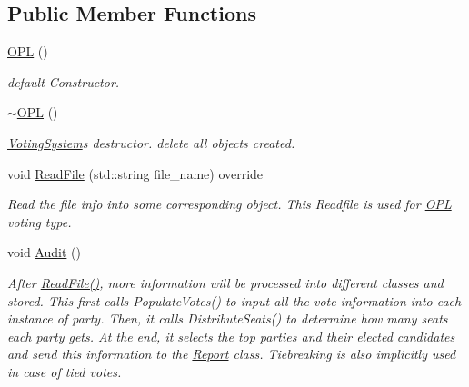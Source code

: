 \subsection*{Public Member Functions}
\begin{DoxyCompactItemize}
\item 
\mbox{\label{classOPL_aee8e3e8733a174df302be1ee7b287a68}} 
\hyperlink{classOPL_aee8e3e8733a174df302be1ee7b287a68}{O\+PL} ()
\begin{DoxyCompactList}\small\item\em default Constructor. \end{DoxyCompactList}\item 
\mbox{\label{classOPL_a22c35b5bf51f6b8f8451a48fcc1f88ba}} 
\hyperlink{classOPL_a22c35b5bf51f6b8f8451a48fcc1f88ba}{$\sim$\+O\+PL} ()
\begin{DoxyCompactList}\small\item\em \hyperlink{classVotingSystem}{Voting\+System}\textquotesingle{}s destructor. {\ttfamily delete} all objects created. \end{DoxyCompactList}\item 
void \hyperlink{classOPL_af13e5b6927d0bd0b979727ba30482cff}{Read\+File} (std\+::string file\+\_\+name) override
\begin{DoxyCompactList}\small\item\em Read the file info into some corresponding object. This Readfile is used for \hyperlink{classOPL}{O\+PL} voting type. \end{DoxyCompactList}\item 
\mbox{\label{classOPL_a06aa12563726561d60c91d32c3e0e3a3}} 
void \hyperlink{classOPL_a06aa12563726561d60c91d32c3e0e3a3}{Audit} ()
\begin{DoxyCompactList}\small\item\em After \hyperlink{classOPL_af13e5b6927d0bd0b979727ba30482cff}{Read\+File()}, more information will be processed into different classes and stored. This first calls Populate\+Votes() to input all the vote information into each instance of party. Then, it calls Distribute\+Seats() to determine how many seats each party gets. At the end, it selects the top parties and their elected candidates and send this information to the \hyperlink{classReport}{Report} class. Tiebreaking is also implicitly used in case of tied votes. \end{DoxyCompactList}\end{DoxyCompactItemize}
